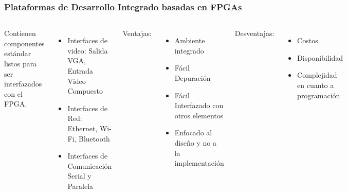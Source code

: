 \frame
{
	\frametitle{Plataformas de Desarrollo Integrado basadas en FPGAs}
  \begin{columns}
  Contienen componentes est\'andar listos para ser interfazados con el FPGA. %
  
\begin{itemize}
	\item \tiny {Interfaces de video: Salida VGA, Entrada Video Compuesto} %
	\item \tiny {Interfaces de Red: Ethernet, Wi-Fi, Bluetooth} %
	\item \tiny {Interfaces de Comunicaci\'on Serial y Paralela} %
\end{itemize}
Ventajas: %
\begin{itemize}
  	\item \tiny Ambiente integrado %
  	\item \tiny F\'acil Depuraci\'on %
  	\item \tiny F\'acil Interfazado con otros elementos %
  	\item \tiny Enfocado al dise\~no y no a la implementaci\'on %
 	\end{itemize}
 	
 	Desventajas: 	%
		\begin{itemize}
			\item \tiny Costos %
			\item \tiny Disponibilidad %
			\item \tiny Complejidad en cuanto a programaci\'on %
		\end{itemize}
	


  \begin{center}
		\begin{figure}      
		 \end{figure}	
		 \end{center}
		\end{columns}
  
}


